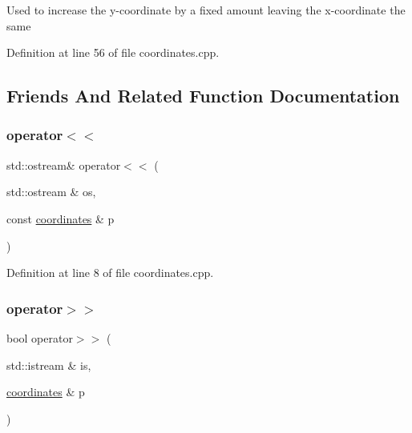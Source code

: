 Used to increase the y-\/coordinate by a fixed amount leaving the x-\/coordinate the same 

Definition at line 56 of file coordinates.\+cpp.



\subsection{Friends And Related Function Documentation}
\mbox{\label{structbattle__ship_1_1coordinates_a3addd697b39df26c1807d744c30e65b5}} 
\subsubsection{\texorpdfstring{operator$<$$<$}{operator<<}}
{\footnotesize\ttfamily std\+::ostream\& operator$<$$<$ (\begin{DoxyParamCaption}\item[{std\+::ostream \&}]{os,  }\item[{const \hyperlink{structbattle__ship_1_1coordinates}{coordinates} \&}]{p }\end{DoxyParamCaption})\hspace{0.3cm}{\ttfamily [friend]}}



Definition at line 8 of file coordinates.\+cpp.

\mbox{\label{structbattle__ship_1_1coordinates_afd9a944ba3ab08355a0ae36d35e57d85}} 
\subsubsection{\texorpdfstring{operator$>$$>$}{operator>>}}
{\footnotesize\ttfamily bool operator$>$$>$ (\begin{DoxyParamCaption}\item[{std\+::istream \&}]{is,  }\item[{\hyperlink{structbattle__ship_1_1coordinates}{coordinates} \&}]{p }\end{DoxyParamCaption})\hspace{0.3cm}{\ttfamily [friend]}}

